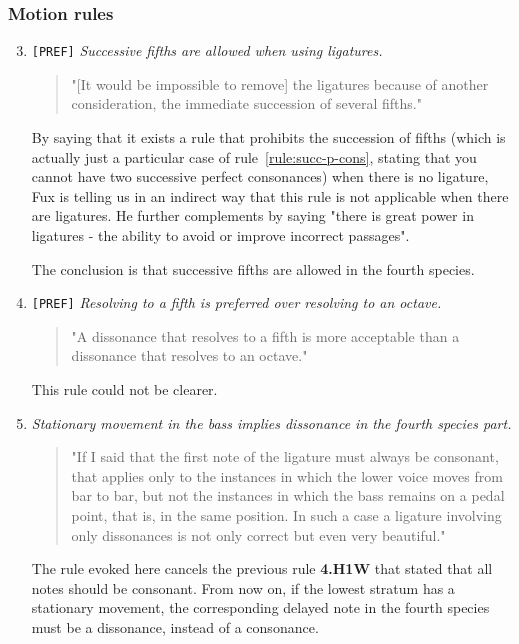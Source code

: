 \subsubsection{Motion rules}
\begin{enumerate}[wide, label=\bfseries 4.P\arabic*]
\setcounter{enumi}{2}
    \item \texttt{[PREF]} \textit{Successive fifths are allowed when using ligatures.} \label{rule:successive-fifths-in-4th-species}    
    \begin{quotation}
        "[It would be impossible to remove] the ligatures because of another consideration, the immediate succession of several fifths."
        \textcite[p.95]{GaPEng}
    \end{quotation}
    By saying that it exists a rule that prohibits the succession of fifths (which is actually just a particular case of rule~\ref{rule:succ-p-cons}, stating that you cannot have two successive perfect consonances) when there is no ligature, Fux is telling us in an indirect way that this rule is not applicable when there are ligatures. He further complements by saying "there is great power in ligatures - the ability to avoid or improve incorrect passages".
    
    The conclusion is that successive fifths are allowed in the fourth species.

    \item \texttt{[PREF]} \textit{Resolving to a fifth is preferred over resolving to an octave.} \label{rule:resolving-to-fifths-rather-than-octaves}    
    \begin{quotation}
        "A dissonance that resolves to a fifth is more acceptable than a dissonance that resolves to an octave."
        \textcite[p.98]{GaPEng}
    \end{quotation}
    This rule could not be clearer.
    
    \item \textit{Stationary movement in the bass implies dissonance in the fourth species part.} \label{rule:dissonance-in-4th-species}
    \begin{quotation}
        "If I said that the first note of the ligature must always be consonant, that applies only to the instances in which the lower voice moves from bar to bar, but not the instances in which the bass remains on a pedal point, that is, in the same position. In such a case a ligature involving only dissonances is not only correct but even very beautiful."
        \textcite[p.98]{GaPEng}
    \end{quotation}
    The rule evoked here cancels the previous rule \textbf{4.H1W} that stated that all notes should be consonant. From now on, if the lowest stratum has a stationary movement, the corresponding delayed note in the fourth species must be a dissonance, instead of a consonance.    



\end{enumerate}
